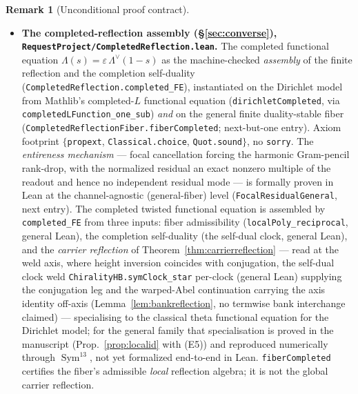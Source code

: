 \documentclass[11pt]{article}
\theoremstyle{definition}
\newtheorem{remark}[theorem]{Remark}
\newcommand{\Sym}{\operatorname{Sym}}
\begin{document}
\begin{remark}[Unconditional proof contract]
\begin{enumerate}
\begin{itemize}
\item \textbf{The completed-reflection assembly (\S\ref{sec:converse}),
\texttt{RequestProject/CompletedReflection.lean}.} The completed functional equation
$\Lambda(s)=\varepsilon\,\Lambda^\vee(1-s)$ as the machine-checked \emph{assembly} of the finite reflection
and the completion self-duality (\texttt{CompletedReflection.completed\_FE}), instantiated on
the Dirichlet model from Mathlib's completed-$L$ functional equation (\texttt{dirichletCompleted}, via
\texttt{completedLFunction\_one\_sub}) \emph{and} on the general finite duality-stable fiber
(\texttt{CompletedReflectionFiber.fiberCompleted}; next-but-one entry). Axiom footprint
$\{$\texttt{propext}, \texttt{Classical.choice}, \texttt{Quot.sound}$\}$, no \texttt{sorry}. The
\emph{entireness mechanism} --- focal cancellation forcing the harmonic Gram-pencil rank-drop, with the
normalized residual an exact nonzero multiple of the readout and hence no independent residual mode --- is
formally proven in Lean at the channel-agnostic (general-fiber) level (\texttt{FocalResidualGeneral}, next
entry). The completed twisted functional equation is assembled by \texttt{completed\_FE} from three inputs:
fiber admissibility (\texttt{localPoly\_reciprocal}, general Lean), the completion self-duality (the self-dual
clock, general Lean), and the \emph{carrier reflection} of Theorem~\ref{thm:carrierreflection} --- read at the
weld axis, where height inversion coincides with conjugation, the self-dual clock weld
\texttt{ChiralityHB.symClock\_star} per-clock (general Lean) supplying the conjugation leg and the warped-Abel
continuation carrying the axis identity off-axis (Lemma~\ref{lem:bankreflection}, no termwise bank interchange
claimed) --- specialising to the classical theta functional equation for
the Dirichlet model; for the general family that specialisation is proved in the manuscript
(Prop.~\ref{prop:localid} with \textup{(E5)}) and reproduced numerically through $\Sym^{13}$, not yet formalized
end-to-end in Lean. \texttt{fiberCompleted}
certifies the fiber's admissible \emph{local} reflection algebra; it is not the global carrier reflection.


\end{itemize}
\end{enumerate}
\end{remark}
\end{document}
